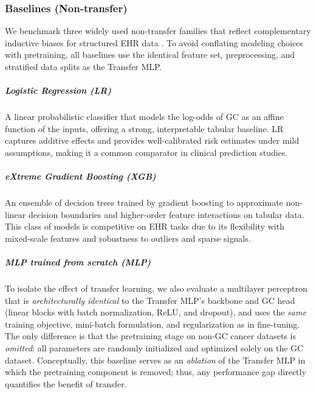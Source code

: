 \documentclass[diagnostics,article,submit,pdftex,moreauthors]{Definitions/mdpi}
\begin{document}
\subsubsection{Baselines (Non-transfer)}
We benchmark three widely used non-transfer families that reflect complementary inductive biases for structured EHR data \citep{EHRBreastRecurrence2023,WANG2023Prostate,park2024SHapley}. To avoid conflating modeling choices with pretraining, all baselines use the identical feature set, preprocessing, and stratified data splits as the Transfer MLP.

\subparagraph{Logistic Regression (LR)}
A linear probabilistic classifier that models the log-odds of GC as an affine function of the inputs, offering a strong, interpretable tabular baseline. LR captures additive effects and provides well-calibrated risk estimates under mild assumptions, making it a common comparator in clinical prediction studies.

\subparagraph{eXtreme Gradient Boosting (XGB)}
An ensemble of decision trees trained by gradient boosting to approximate non-linear decision boundaries and higher-order feature interactions on tabular data. This class of models is competitive on EHR tasks due to its flexibility with mixed-scale features and robustness to outliers and sparse signals.

\subparagraph{MLP trained from scratch (MLP)}
To isolate the effect of transfer learning, we also evaluate a multilayer perceptron that is \emph{architecturally identical} to the Transfer MLP’s backbone and GC head (linear blocks with batch normalization, ReLU, and dropout), and uses the \emph{same} training objective, mini-batch formulation, and regularization as in fine-tuning. The only difference is that the pretraining stage on non-GC cancer datasets is \emph{omitted}: all parameters are randomly initialized and optimized solely on the GC dataset. Conceptually, this baseline serves as an \emph{ablation} of the Transfer MLP in which the pretraining component is removed; thus, any performance gap directly quantifies the benefit of transfer.
\end{document}
